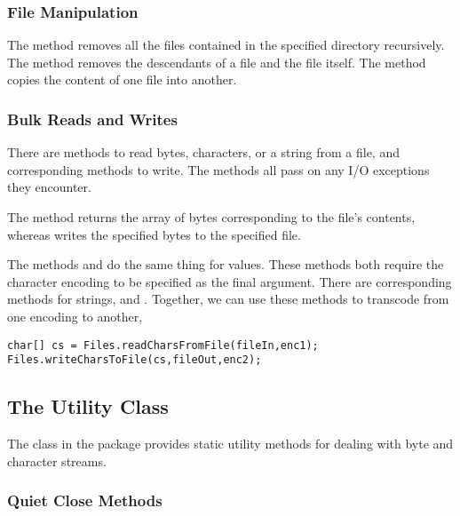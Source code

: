 \subsubsection{File Manipulation}

The method  removes all the files
contained in the specified directory recursively.  The
 method removes the descendants of a file
and the file itself.  The  method
copies the content of one file into another.

\subsubsection{Bulk Reads and Writes}

There are methods to read bytes, characters, or a string from a file,
and corresponding methods to write.  The methods all pass on any I/O
exceptions they encounter.

The method  returns the array of bytes
corresponding to the file's contents, whereas
 writes the specified bytes to the
specified file.

The methods  and
 do the same thing for
 values.  These methods both require the character encoding
to be specified as the final argument.  There are corresponding
methods for strings,  and
.  Together, we can
use these methods to transcode from one encoding to another,
%
\begin{verbatim}
char[] cs = Files.readCharsFromFile(fileIn,enc1);
Files.writeCharsToFile(cs,fileOut,enc2);
\end{verbatim}


\subsection{The  Utility Class}

The class  in the package  provides
static utility methods for dealing with byte and character streams.  

\subsubsection{Quiet Close Methods}

